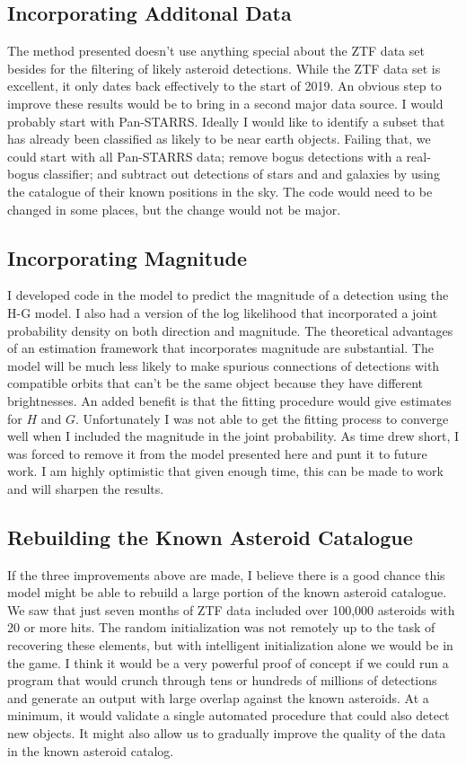 \subsection{Incorporating Additonal Data}
The method presented doesn't use anything special about the ZTF data set besides for the filtering of likely asteroid detections.
While the ZTF data set is excellent, it only dates back effectively to the start of 2019.
An obvious step to improve these results would be to bring in a second major data source.
I would probably start with Pan-STARRS.
Ideally I would like to identify a subset that has already been classified as likely to be near earth objects.
Failing that, we could start with all Pan-STARRS data; remove bogus detections with a real-bogus classifier;
and subtract out detections of stars and and galaxies by using the catalogue of their known positions in the sky.
The code would need to be changed in some places, but the change would not be major.

\subsection{Incorporating Magnitude}
I developed code in the  model to predict the magnitude of a detection using the H-G model.
I also had a version of the log likelihood that incorporated a joint probability density on both direction and magnitude.
The theoretical advantages of an estimation framework that incorporates magnitude are substantial.
The model will be much less likely to make spurious connections of detections with compatible orbits
that can't be the same object because they have different brightnesses.
An added benefit is that the fitting procedure would give estimates for $H$ and $G$.
Unfortunately I was not able to get the fitting process to converge well when I included the magnitude in the joint probability.
As time drew short, I was forced to remove it from the model presented here and punt it to future work.
I am highly optimistic that given enough time, this can be made to work and will sharpen the results.

\subsection{Rebuilding the Known Asteroid Catalogue}
If the three improvements above are made, I believe there is a good chance this model might be able to rebuild a large portion of the known asteroid catalogue.
We saw that just seven months of ZTF data included over 100,000 asteroids with 20 or more hits.
The random initialization was not remotely up to the task of recovering these elements, but with intelligent initialization alone we would be in the game.
I think it would be a very powerful proof of concept if we could run a program that would crunch through tens or hundreds of millions of detections and
generate an output with large overlap against the known asteroids.
At a minimum, it would validate a single automated procedure that could also detect new objects.
It might also allow us to gradually improve the quality of the data in the known asteroid catalog.

